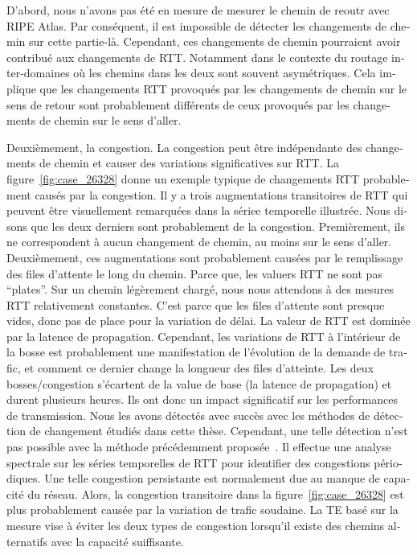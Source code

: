 \begin{otherlanguage}{french}
D'abord, nous n'avons pas été en mesure de mesurer le chemin de reoutr avec RIPE Atlas.
Par conséquent, il est impossible de détecter les changements de chemin sur cette partie-là.
Cependant, ces changements de chemin pourraient avoir contribué aux changements de RTT.
Notamment dans le contexte du routage inter-domaines où les chemins dans les deux sont souvent asymétriques.
Cela implique que les changements RTT provoqués par les changements de chemin sur le sens de retour 
sont probablement différents de ceux provoqués par les changements de chemin sur le sens d'aller.

Deuxièmement, la congestion.
La congestion peut être indépendante des changements de chemin et causer des variations significatives sur RTT.
La figure~\ref{fig:case_26328} donne un exemple typique de changements RTT probablement causés par la congestion.
Il y a trois augmentations transitoires de RTT qui peuvent être visuellement remarquées dans la sériee temporelle illustrée.
Nous disons que les deux derniers sont probablement de la congestion.
Premièrement, ils ne correspondent à aucun changement de chemin, au moins sur le sens d'aller.
Deuxièmement, ces augmentations sont probablement causées par le remplissage des files d'attente le long du chemin.
Parce que, les valuers RTT ne sont pas ``plates''.
Sur un chemin légèrement chargé, nous nous attendons à des mesures RTT relativement constantes.
C'est parce que les files d'attente sont presque vides, donc pas de place pour la variation de délai.
La valeur de RTT est dominée par la latence de propagation.
Cependant, les variations de RTT à l'intérieur de la bosse est 
probablement une manifestation de l'évolution de la demande de trafic, et comment ce dernier change la longueur des files d'atteinte.
Les deux bosses/congestion s'écartent de la value de base (la latence de propagation) et durent plusieurs heures.
Ils ont donc un impact significatif sur les performances de transmission.
Nous les avons détectés avec succès avec les méthodes de détection de changement étudiés dans cette thèse.
Cependant, une telle détection n'est pas possible avec la méthode précédemment proposée~\cite{Luckie2014}.
Il effectue une analyse spectrale sur les séries temporelles de RTT pour identifier des congestions périodiques.
Une telle congestion persistante est normalement due au manque de capacité du réseau.
Alors, la congestion transitoire dans la figure~\ref {fig:case_26328} est plus probablement causée 
par la variation de trafic soudaine.
La TE basé sur la mesure vise à éviter les deux types de congestion 
lorsqu'il existe des chemins alternatifs avec la capacité suiffisante.


\end{otherlanguage}
